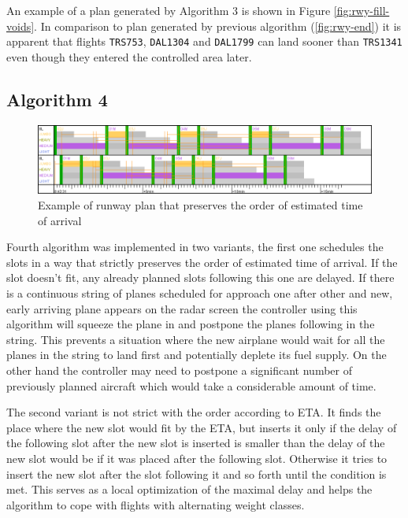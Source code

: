 An example of a plan generated by Algorithm 3 is shown in Figure \ref{fig:rwy-fill-voids}. In comparison to plan generated by previous algorithm (\ref{fig:rwy-end}) it is apparent that flights \texttt{TRS753}, \texttt{DAL1304} and \texttt{DAL1799} can land sooner than \texttt{TRS1341} even though they entered the controlled area later.

\subsection{Algorithm 4}

\begin{figure}[h]
    \centering
    \includegraphics[width=\textwidth]{figures/rwy-eta-order.png}
    \caption{Example of runway plan that preserves the order of estimated time of arrival}
    \label{fig:rwy-eta-order}
\end{figure}

Fourth algorithm was implemented in two variants, the first one schedules the slots in a way that strictly preserves the order of estimated time of arrival. If the slot doesn't fit, any already planned slots following this one are delayed. If there is a continuous string of planes scheduled for approach one after other and new, early arriving plane appears on the radar screen the controller using this algorithm will squeeze the plane in and postpone the planes following in the string. This prevents a situation where the new airplane would wait for all the planes in the string to land first and potentially deplete its fuel supply. On the other hand the controller may need to postpone a significant number of previously planned aircraft which would take a considerable amount of time.

The second variant is not strict with the order according to ETA. It finds the place where the new slot would fit by the ETA, but inserts it only if the delay of the following slot after the new slot is inserted is smaller than the delay of the new slot would be if it was placed after the following slot. Otherwise it tries to insert the new slot after the slot following it and so forth until the condition is met. This serves as a local optimization of the maximal delay and helps the algorithm to cope with flights with alternating weight classes.


